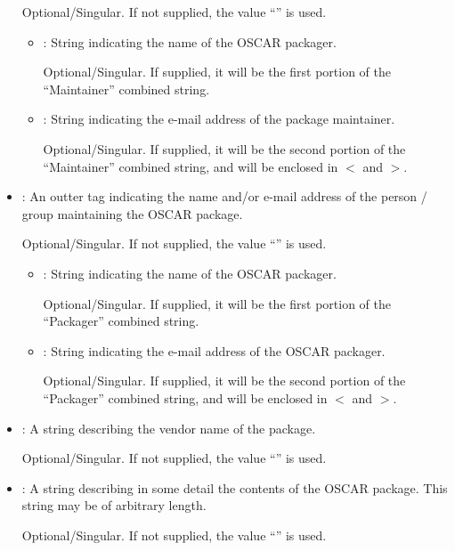 \begin{itemize}
  Optional/Singular.  If not supplied, the value
  ``'' is used.

  \begin{itemize}
  \item {}: String indicating the name of the OSCAR
    packager.
    
    Optional/Singular.  If supplied, it will be the first portion of
    the ``Maintainer'' combined string.
    
  \item {}: String indicating the e-mail address of the
    package maintainer.
    
    Optional/Singular.  If supplied, it will be the second portion of
    the ``Maintainer'' combined string, and will be enclosed in $<$
    and $>$.
  \end{itemize}

\item {}: An outter tag indicating the name and/or
  e-mail address of the person / group maintaining the OSCAR package.

  Optional/Singular.  If not supplied, the value
  ``'' is used.

  \begin{itemize}
  \item {}: String indicating the name of the OSCAR
    packager.
    
    Optional/Singular.  If supplied, it will be the first portion of
    the ``Packager'' combined string.
    
  \item {}: String indicating the e-mail address of the
    OSCAR packager.
    
    Optional/Singular.  If supplied, it will be the second portion of
    the ``Packager'' combined string, and will be enclosed in $<$
    and $>$.
  \end{itemize}
    
\item {}: A string describing the vendor name of the
  package.
  
  Optional/Singular.  If not supplied, the value
  ``'' is used.

\item {}: A string describing in some detail the
  contents of the OSCAR package.  This string may be of arbitrary
  length.
  
  Optional/Singular.  If not supplied, the value
  ``'' is used.


\end{itemize}

